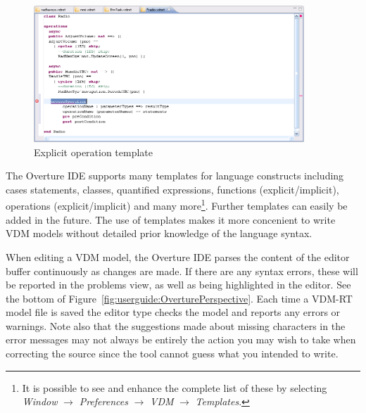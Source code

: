 \begin{figure}
	\begin{center}
	\includegraphics[width=4in]{figures/OperationTemplateRT}
	\caption{Explicit operation template}
	\label{fig:userguide:operationTemplate}
	\end{center}
\end{figure}

The Overture IDE supports many templates for language constructs
including cases statements, classes, quantified expressions, functions
(explicit/implicit), operations (explicit/implicit) and many
more\footnote{It is possible to see and enhance the complete list of
  these by selecting \emph{Window} $\rightarrow$ \emph{Preferences}
  $\rightarrow$ \emph{VDM}  $\rightarrow$ \emph{Templates}.}. 
Further templates can easily be added in the future. The use of
templates makes it more concenient to write VDM models without
detailed prior knowledge of the language syntax.

When editing a VDM model, the Overture IDE parses the content of the
editor buffer continuously as changes are made. If there are any
syntax errors, these will be reported in the problems view, as well as
being highlighted in the editor. See the bottom of
Figure~\ref{fig:userguide:OverturePerspective}. Each time a
VDM-RT model file is saved the editor type checks the model and reports
any errors or warnings. Note also that the suggestions made about
missing characters in the
error messages may not always be entirely the action you may wish to
take when correcting the source since the tool cannot guess what you
intended to write.




